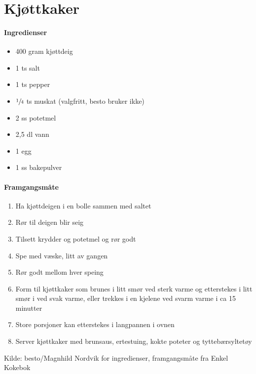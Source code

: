 \section{﻿Kjøttkaker}


\paragraph{Ingredienser}
\begin{itemize}[noitemsep]
	\item 400 gram kjøttdeig
	\item 1 ts salt
	\item 1 ts pepper
	\item $\sfrac{1}{4}$  ts muskat (valgfritt, besto bruker ikke)
	\item 2 ss potetmel
	\item 2,5 dl vann
	\item 1 egg
	\item 1 ss bakepulver
\end{itemize}

\paragraph{Framgangsmåte}
\begin{enumerate}[noitemsep]
	\item Ha kjøttdeigen i en bolle sammen med saltet
	\item Rør til deigen blir seig
	\item Tilsett krydder og potetmel og rør godt
	\item Spe med væske, litt av gangen
	\item Rør godt mellom hver speing
	\item Form til kjøttkaker som brunes i litt smør ved sterk varme og etterstekes i litt smør i ved svak varme, eller trekkes i en kjelene ved svarm varme i ca 15 minutter
	\item Store porsjoner kan etterstekes i langpannen i ovnen
	\item Server kjøttkaker med brunsaus, ertestuing, kokte poteter og tyttebærsyltetøy
\end{enumerate}


Kilde: besto/Magnhild Nordvik for ingredienser, framgangsmåte fra Enkel Kokebok
